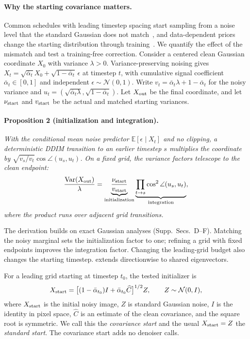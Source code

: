 \paragraph{Why the starting covariance matters.}
Common schedules with leading timestep spacing start sampling from a
noise level that the standard Gaussian does not match~\cite{lin2024flawed},
and data-dependent priors change the starting distribution through
training~\cite{lee2022priorgrad}. We quantify the effect of the mismatch
and test a training-free correction. Consider a centered clean Gaussian
coordinate $X_0$ with variance
$\lambda>0$. Variance-preserving noising gives
$X_t=\sqrt{\bar\alpha_t}X_0+\sqrt{1-\bar\alpha_t}\,\epsilon$ at
timestep $t$, with cumulative signal coefficient $\bar\alpha_t\in[0,1]$
and independent $\epsilon\sim\mathcal N(0,1)$. Write
$v_t=\bar\alpha_t\lambda+1-\bar\alpha_t$ for the noisy variance and
$u_t=(\sqrt{\bar\alpha_t\lambda},\sqrt{1-\bar\alpha_t})$.
Let $X_{\rm out}$ be the final coordinate, and let $\nu_{\rm start}$ and
$v_{\rm start}$ be the actual and matched starting variances.

\paragraph{Proposition 2 (initialization and integration).}
\emph{With the conditional mean noise predictor
$\mathbb E[\epsilon\mid X_t]$ and no clipping, a deterministic DDIM
transition to an earlier timestep $s$ multiplies the coordinate by
$\sqrt{v_s/v_t}\cos\angle(u_s,u_t)$. On a fixed grid, the variance factors
telescope to the clean endpoint:}
\begin{equation}
\frac{\operatorname{Var}(X_{\rm out})}{\lambda}
=\underbrace{\frac{\nu_{\rm start}}{v_{\rm start}}}_{\text{initialization}}
\underbrace{\prod_{t\rightarrow s}\cos^2\angle(u_s,u_t)}_{\text{integration}},
\label{eq:gaussian}
\end{equation}
\emph{where the product runs over adjacent grid transitions.}

The derivation builds on exact Gaussian analyses
\cite{benita2025spectral,pierret2025gaussian}
(Supp.~Secs.~D--F). Matching the noisy marginal sets the initialization
factor to one; refining a grid with fixed endpoints improves the
integration factor. Changing the leading-grid budget also changes the
starting timestep.  extends directionwise to shared
eigenvectors.

For a leading grid starting at timestep $t_0$, the tested initializer is
\begin{equation}
X_{\rm start}=
\big[(1-\bar\alpha_{t_0})I+\bar\alpha_{t_0}\widehat C\big]^{1/2}Z,
\qquad Z\sim\mathcal N(0,I),
\label{eq:covariance_start}
\end{equation}
where $X_{\rm start}$ is the initial noisy image, $Z$ is standard Gaussian
noise, $I$ is the identity in pixel space, $\widehat C$ is an estimate of
the clean covariance, and the square root is symmetric. We call this the
\emph{covariance start} and the usual $X_{\rm start}=Z$ the
\emph{standard start}. The covariance start adds no denoiser calls.

